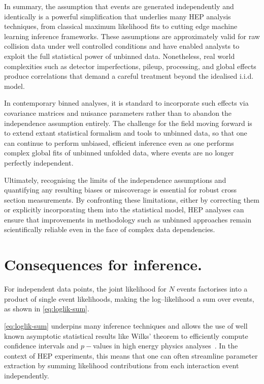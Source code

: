     In summary, the assumption that events are generated independently and identically is a powerful simplification that underlies many HEP analysis techniques, from classical maximum likelihood fits to cutting edge machine learning inference frameworks.
    These assumptions are approximately valid for raw collision data under well controlled conditions and have enabled analysts to exploit the full statistical power of unbinned data.
    Nonetheless, real world complexities such as detector imperfections, pileup, processing, and global effects produce correlations that demand a careful treatment beyond the idealised i.i.d. model.
    
    In contemporary binned analyses, it is standard to incorporate such effects via covariance matrices and nuisance parameters rather than to abandon the independence assumption entirely.
    The challenge for the field moving forward is to extend extant statistical formalism and tools to unbinned data, so that one can continue to perform unbiased, efficient inference even as one performs complex global fits of unbinned unfolded data, where events are no longer perfectly independent.
    
    Ultimately, recognising the limits of the independence assumptions and quantifying any resulting biases or miscoverage is essential for robust cross section measurements.
    By confronting these limitations, either by correcting them or explicitly incorporating them into the statistical model, HEP analyses can ensure that improvements in methodology such as unbinned approaches remain scientifically reliable even in the face of complex data dependencies.
    
\section{Consequences for inference.}
\label{sec:impact}

    For independent data points, the joint likelihood for $N$ events factorises into a product of single event likelihoods, making the log--likelihood a sum over events, as shown in \cref{eq:loglik-sum}.
    
    \cref{eq:loglik-sum} underpins many inference techniques and allows the use of well known asymptotic statistical results like Wilks' theorem to efficiently compute confidence intervals and $p-$values in high energy physics analyses~\cite{Cowan2011AsymptoticPhysics}.
    In the context of HEP experiments, this means that one can often streamline parameter extraction by summing likelihood contributions from each interaction event independently.

